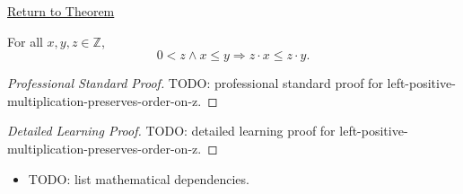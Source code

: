 \newpage
{}
\label{prf:left-positive-multiplication-preserves-order-on-z}

\begin{remark*}[Return]
\hyperref[thm:left-positive-multiplication-preserves-order-on-z]{Return to Theorem}
\end{remark*}

\begin{theorem*}
For all $x,y,z\in\mathbb{Z}$,
\[
0<z\land x\le y \Longrightarrow z\cdot x\le z\cdot y.
\]
\end{theorem*}

\begin{proof}[Professional Standard Proof]
\LRAProofBodyStart
TODO: professional standard proof for left-positive-multiplication-preserves-order-on-z.
\end{proof}

\begin{proof}[Detailed Learning Proof]
\LRAProofBodyStart
TODO: detailed learning proof for left-positive-multiplication-preserves-order-on-z.
\end{proof}

\begin{remark*}
\end{remark*}

\begin{dependencies}
\begin{itemize}
  \item TODO: list mathematical dependencies.
\end{itemize}
\end{dependencies}

\clearpage
